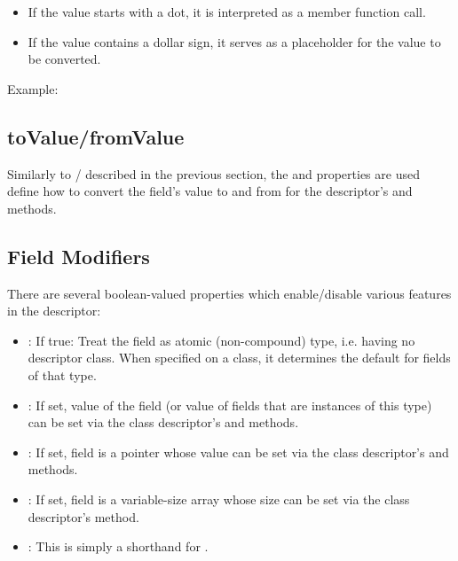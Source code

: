 \begin{itemize}
  \item If the value starts with a dot, it is interpreted as a member function call.
  \item If the value contains a dollar sign, it serves as a placeholder for the
        value to be converted.
\end{itemize}

Example:



\subsection{toValue/fromValue}
\label{sec:msg-defs:descriptor-tovalue}

Similarly to / described in the previous
section, the  and  properties are used define
how to convert the field's value to and from  for the
descriptor's  and  methods.


\subsection{Field Modifiers}
\label{sec:msg-defs:descriptor-fieldmodifiers}

There are several boolean-valued properties which enable/disable various
features in the descriptor:

\begin{itemize}

  \item {}: If true: Treat the field as atomic (non-compound) type, i.e.
    having no descriptor class. When specified on a class, it determines the default
    for fields of that type.

  \item {}: If set, value of the field (or value of fields that
    are instances of this type) can be set via the class descriptor's
     and  methods.

  \item {}: If set, field is a pointer whose value can be set
    via the class descriptor's  and
     methods.

  \item {}: If set, field is a variable-size array whose size
    can be set via the class descriptor's  method.

  \item {}: This is simply a shorthand for .

\end{itemize}
